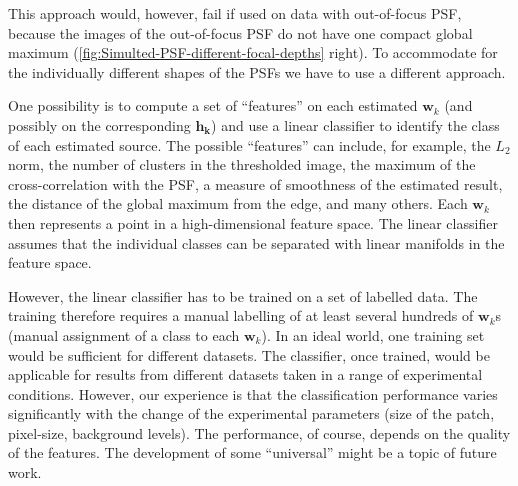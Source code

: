 This approach would, however, fail if used on data with out-of-focus PSF, because the images of the out-of-focus PSF do not have one compact global maximum (\autoref{fig:Simulted-PSF-different-focal-depths} right). To accommodate for the individually different shapes of the PSFs we have to use a different approach. 

One possibility is to compute a set of ``features'' on each estimated $\bm{w}_k$ (and possibly on the corresponding $\bm{h_k}$) and use a linear classifier to identify the class of each estimated source. The possible ``features'' can include, for example, the $L_2$ norm, the number of clusters in the thresholded image, the maximum of the cross-correlation with the PSF, a measure of smoothness of the estimated result, the distance of the global maximum from the edge, and many others. Each $\bm{w}_k$ then represents a point in a high-dimensional feature space. The linear classifier assumes that the individual classes can be separated with linear manifolds in the feature space.

However, the linear classifier has to be trained on a set of labelled data. The training therefore requires a manual labelling of at least several hundreds of $\bm{w}_k$s (manual assignment of a class to each $\bm{w}_k$). In an ideal world, one training set would be sufficient for different datasets. The classifier, once trained, would be applicable for results from different datasets taken in a range of experimental conditions. However, our experience is that the classification performance varies significantly with the change of the experimental parameters (size of the patch, pixel-size, background levels). The performance, of course, depends on the quality of the features.  The development of some ``universal'' might be a topic of future work. 

